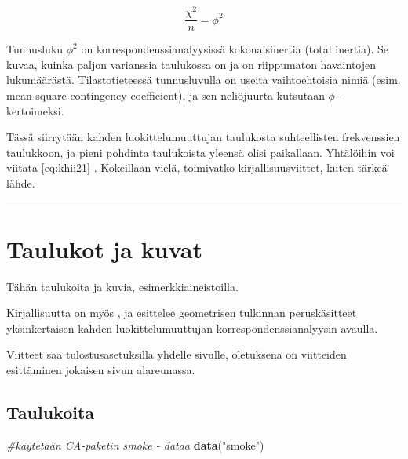 \documentclass[finnish,]{book}
\newenvironment{Shaded}{\begin{snugshade}}{\end{snugshade}}
\newcommand{\CommentTok}[1]{\textcolor[rgb]{0.56,0.35,0.01}{\textit{#1}}}
\newcommand{\KeywordTok}[1]{\textcolor[rgb]{0.13,0.29,0.53}{\textbf{#1}}}
\newcommand{\NormalTok}[1]{#1}
\newcommand{\StringTok}[1]{\textcolor[rgb]{0.31,0.60,0.02}{#1}}
\theoremstyle{definition}
\theoremstyle{definition}
\theoremstyle{definition}
\theoremstyle{remark}
\begin{document}
\begin{equation}

 \frac{\chi^{2}}{n} = \phi^{2}
 
 \label{eq:inert1}
 

\end{equation}

Tunnusluku \(\phi^{2}\) on korrespondenssianalyysissä kokonaisinertia
(total inertia). Se kuvaa, kuinka paljon varianssia taulukossa on ja on
riippumaton havaintojen lukumäärästä. Tilastotieteessä tunnusluvulla on
useita vaihtoehtoisia nimiä (esim. mean square contingency coefficient),
ja sen neliöjuurta kutsutaan \(\phi\) - kertoimeksi.

Tässä siirrytään kahden luokittelumuuttujan taulukosta suhteellisten
frekvenssien taulukkoon, ja pieni pohdinta taulukoista yleensä olisi
paikallaan. Yhtälöihin voi viitata \eqref{eq:khii21} . Kokeillaan vielä,
toimivatko kirjallisuusviittet, kuten tärkeä lähde\citep{RefWorks:55}.

\begin{center}\rule{0.5\linewidth}{\linethickness}\end{center}

\hypertarget{taulukot-ja-kuvat}{%
\chapter{Taulukot ja kuvat}\label{taulukot-ja-kuvat}}

Tähän taulukoita ja kuvia, esimerkkiaineistoilla.

Kirjallisuutta on myös \citep{RefWorks:68}, ja \citep{RefWorks:57}
esittelee geometrisen tulkinnan peruskäsitteet yksinkertaisen kahden
luokittelumuuttujan korrespondenssianalyysin avaulla.

Viitteet saa tulostusasetuksilla yhdelle sivulle, oletuksena on
viitteiden esittäminen jokaisen sivun alareunassa.

\hypertarget{taulukoita}{%
\section{Taulukoita}\label{taulukoita}}

\begin{Shaded}
\begin{Highlighting}[]
\CommentTok{#käytetään CA-paketin smoke - dataa}
\KeywordTok{data}\NormalTok{(}\StringTok{"smoke"}\NormalTok{)}
\end{Highlighting}
\end{Shaded}
\end{document}
